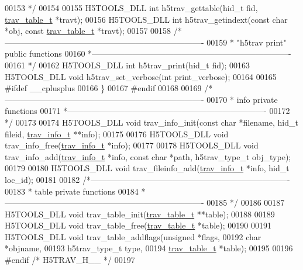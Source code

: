\begin{DoxyCode}
00153 \textcolor{comment}{ */}
00154 
00155 H5TOOLS\_DLL \textcolor{keywordtype}{int}  h5trav\_gettable(hid\_t fid, \hyperlink{structtrav__table__t}{trav\_table\_t} *travt);
00156 H5TOOLS\_DLL \textcolor{keywordtype}{int}  h5trav\_getindext(\textcolor{keyword}{const} \textcolor{keywordtype}{char} *obj, \textcolor{keyword}{const} \hyperlink{structtrav__table__t}{trav\_table\_t} *travt);
00157 
00158 \textcolor{comment}{/*-------------------------------------------------------------------------}
00159 \textcolor{comment}{ * "h5trav print" public functions}
00160 \textcolor{comment}{ *-------------------------------------------------------------------------}
00161 \textcolor{comment}{ */}
00162 H5TOOLS\_DLL \textcolor{keywordtype}{int} h5trav\_print(hid\_t fid);
00163 H5TOOLS\_DLL \textcolor{keywordtype}{void} h5trav\_set\_verbose(\textcolor{keywordtype}{int} print\_verbose);
00164 
00165 \textcolor{preprocessor}{#ifdef \_\_cplusplus}
00166 \}
00167 \textcolor{preprocessor}{#endif}
00168 
00169 \textcolor{comment}{/*-------------------------------------------------------------------------}
00170 \textcolor{comment}{ * info private functions}
00171 \textcolor{comment}{ *-------------------------------------------------------------------------}
00172 \textcolor{comment}{ */}
00173 
00174 H5TOOLS\_DLL \textcolor{keywordtype}{void} trav\_info\_init(\textcolor{keyword}{const} \textcolor{keywordtype}{char} *filename, hid\_t fileid, \hyperlink{structtrav__info__t}{trav\_info\_t} **info);
00175 
00176 H5TOOLS\_DLL \textcolor{keywordtype}{void} trav\_info\_free(\hyperlink{structtrav__info__t}{trav\_info\_t} *info);
00177 
00178 H5TOOLS\_DLL \textcolor{keywordtype}{void} trav\_info\_add(\hyperlink{structtrav__info__t}{trav\_info\_t} *info, \textcolor{keyword}{const} \textcolor{keywordtype}{char} *path, h5trav\_type\_t obj\_type);
00179 
00180 H5TOOLS\_DLL \textcolor{keywordtype}{void} trav\_fileinfo\_add(\hyperlink{structtrav__info__t}{trav\_info\_t} *info, hid\_t loc\_id);
00181 
00182 \textcolor{comment}{/*-------------------------------------------------------------------------}
00183 \textcolor{comment}{ * table private functions}
00184 \textcolor{comment}{ *-------------------------------------------------------------------------}
00185 \textcolor{comment}{ */}
00186 
00187 H5TOOLS\_DLL \textcolor{keywordtype}{void} trav\_table\_init(\hyperlink{structtrav__table__t}{trav\_table\_t} **table);
00188 
00189 H5TOOLS\_DLL \textcolor{keywordtype}{void} trav\_table\_free(\hyperlink{structtrav__table__t}{trav\_table\_t} *table);
00190 
00191 H5TOOLS\_DLL \textcolor{keywordtype}{void} trav\_table\_addflags(\textcolor{keywordtype}{unsigned} *flags,
00192                          \textcolor{keywordtype}{char} *objname,
00193                          h5trav\_type\_t type,
00194                          \hyperlink{structtrav__table__t}{trav\_table\_t} *table);
00195 
00196 \textcolor{preprocessor}{#endif  }\textcolor{comment}{/* H5TRAV\_H\_\_ */}\textcolor{preprocessor}{}
00197 
\end{DoxyCode}
